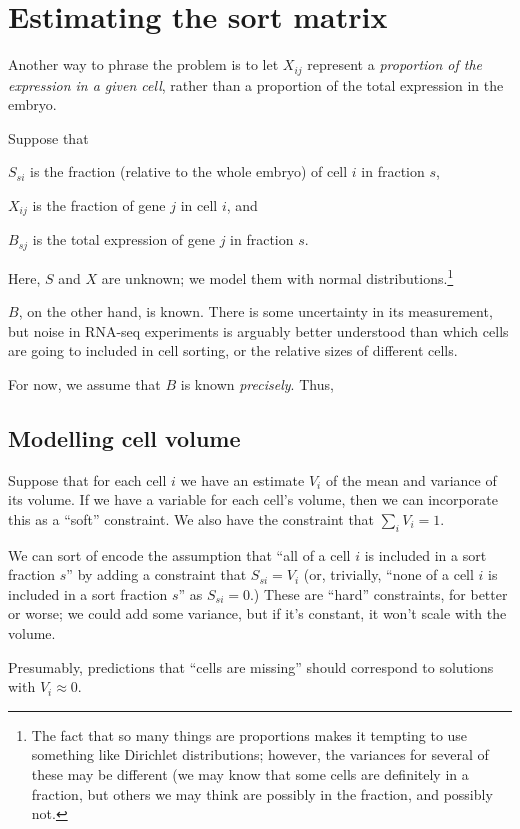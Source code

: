 \documentclass{article}
\begin{document}
\section{Estimating the sort matrix}


Another way to phrase the problem is to let $X_{ij}$ represent
a {\em proportion of the expression in a given cell}, rather than
a proportion of the total expression in the embryo.

Suppose that

$S_{si}$ is the fraction (relative to the whole embryo)
of cell $i$ in fraction $s$,

$X_{ij}$ is the fraction of gene $j$ in cell $i$, and

$B_{sj}$ is the total expression of gene $j$ in fraction $s$.

Here, $S$ and $X$ are unknown; we model them with normal
distributions.\footnote{The fact that so many things are proportions makes it tempting
to use something like Dirichlet distributions; however, the variances
for several of these may be different (we may know that some cells
are definitely in a fraction, but others we may think are possibly 
in the fraction, and possibly not.}

$B$, on the other hand, is known. There is some uncertainty in its
measurement, but noise in RNA-seq experiments is arguably better understood
than which cells are going to included in cell sorting, or the relative
sizes of different cells.

For now, we assume that $B$ is known {\em precisely}. Thus, 


\subsection{Modelling cell volume}

Suppose that for each cell $i$ we have an estimate $V_i$ of the mean and
variance of its volume. If we have a variable for each cell's volume, then
we can incorporate this as a ``soft'' constraint. We also have the constraint
that $\sum_i V_i = 1$.

We can sort of encode the assumption that ``all of a cell $i$ is included
in a sort fraction $s$'' by adding a constraint that $S_{si} = V_i$
(or, trivially, ``none of a cell $i$ is included in a sort fraction $s$''
as $S_{si} = 0$.) These are ``hard'' constraints, for better or worse;
we could add some variance, but if it's constant, it won't scale with
the volume.

Presumably, predictions that ``cells are missing'' should correspond to
solutions with $V_i \approx 0$.
\end{document}
